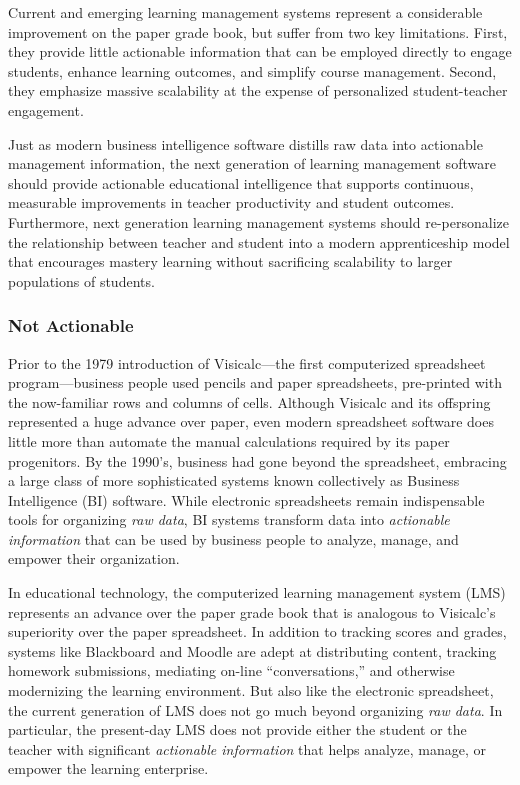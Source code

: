 \documentclass{article}
\begin{document}
Current and emerging learning management systems
represent a considerable improvement on the paper grade book,
but suffer from two key limitations.
First, they provide little actionable information
that can be employed directly
to engage students,
enhance learning outcomes,
and simplify course management.
Second, they emphasize massive scalability
at the expense of
personalized student-teacher engagement.

Just as modern business intelligence software
distills raw data into actionable management information,
the next generation of learning management software
should provide actionable educational intelligence
that supports continuous, measurable improvements
in teacher productivity and student outcomes.
Furthermore, next generation learning management systems
should re-personalize the relationship between teacher and student
into a modern apprenticeship model that
encourages mastery learning without sacrificing scalability
to larger populations of students.

\subsubsection{Not Actionable}

Prior to the 1979 introduction of
Visicalc---the first computerized spreadsheet program---business people
used pencils and paper spreadsheets,
pre-printed with the now-familiar rows and columns of cells.
Although Visicalc and its offspring represented a huge advance over paper,
even modern spreadsheet software does little more than automate the manual
calculations required by its paper progenitors.
By the 1990's,
business had gone beyond the spreadsheet,
embracing a large class of more sophisticated
systems known collectively as Business Intelligence (BI) software.
While electronic spreadsheets remain indispensable tools for organizing \emph{raw data},
BI systems transform data into \emph{actionable information}
that can be used by business people
to analyze, manage, and empower their organization.

In educational technology,
the computerized learning management system (LMS)
represents an advance over the paper grade book
that is analogous to Visicalc's superiority over the paper spreadsheet.
In addition to tracking scores and grades,
systems like Blackboard and Moodle
are adept at distributing content,
tracking homework submissions,
mediating on-line ``conversations,''
and otherwise modernizing the learning environment.
But also like the electronic spreadsheet,
the current generation of LMS does not go much beyond organizing \emph{raw data}.
In particular, the present-day LMS does not provide either the student or the teacher
with significant \emph{actionable information} that helps
analyze, manage, or empower the learning enterprise.
\end{document}
